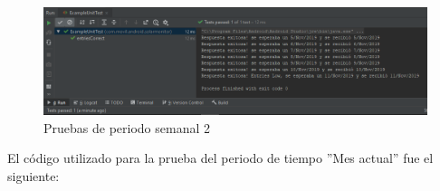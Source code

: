 \begin{figure}[H]
	\centering
	\includegraphics[scale=.4]{Capitulo5/images/PruebasSemanalPeriodo2.png}
	\caption{Pruebas de periodo semanal 2}
	\label{fig:Pruebas_de_periodo_semanal2}
\end{figure}

El código utilizado para la prueba del periodo de tiempo ''Mes actual'' fue el siguiente:\\ \newline


